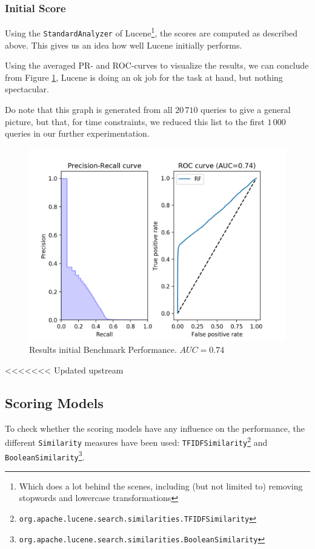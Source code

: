\documentclass[11pt]{article}
\begin{document}
\subsubsection{Initial Score}
Using the \texttt{StandardAnalyzer} of Lucene\footnote{Which does a lot behind the scenes, including (but not limited to) removing stopwords and lowercase transformations}, the scores are computed as described above. This gives us an idea how well Lucene initially performs.

Using the averaged PR- and ROC-curves to visualize the results, we can conclude from Figure \ref{fig:initBP}, Lucene is doing an ok job for the task at hand, but nothing spectacular.

Do note that this graph is generated from all $20\,710$ queries to give a general picture, but that, for time constraints, we reduced this list to the first $1\,000$ queries in our further experimentation.

\begin{figure}[h!]
    \centering
    \includegraphics[width=\textwidth]{images/StandardAnalyzer}
    \caption{Results initial Benchmark Performance. $AUC = 0.74$}
    \label{fig:initBP}
\end{figure}

<<<<<<< Updated upstream
\subsection{Scoring Models}
To check whether the scoring models have any influence on the performance, the different \texttt{Similarity} measures have been used: \texttt{TFIDFSimilarity}\footnote{\texttt{org.apache.lucene.search.similarities.TFIDFSimilarity}} and \texttt{BooleanSimilarity}\footnote{\texttt{org.apache.lucene.search.similarities.BooleanSimilarity}}. 
\end{document}
